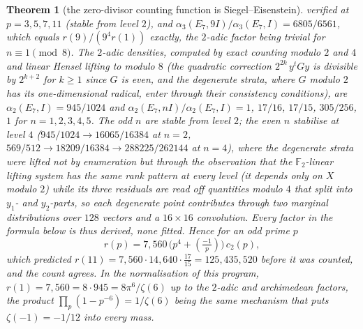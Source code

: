 \documentclass[11pt]{amsart}
\newtheorem{theorem}{Theorem}[section]
\theoremstyle{definition}
\begin{document}
\begin{theorem}[the zero-divisor counting function is Siegel--Eisenstein]
verified at $p=3,5,7,11$ (stable from level $2$), and $\alpha_3(E_7,9I)/\alpha_3(E_7,I)=6805/6561$, which equals $r(9)/(9^4r(1))$ exactly, the $2$-adic factor being trivial for $n\equiv1\pmod 8$. The $2$-adic densities, computed by exact counting modulo $2$ and $4$ and linear Hensel lifting to modulo $8$ (the quadratic correction $2^{2k}\,y^tGy$ is divisible by $2^{k+2}$ for $k\ge1$ since $G$ is even, and the degenerate strata, where $G$ modulo $2$ has its one-dimensional radical, enter through their consistency conditions), are $\alpha_2(E_7,I)=945/1024$ and $\alpha_2(E_7,nI)/\alpha_2(E_7,I)=1$, $17/16$, $17/15$, $305/256$, $1$ for $n=1,2,3,4,5$. The odd $n$ are stable from level $2$; the even $n$ stabilise at level $4$ ($945/1024\to16065/16384$ at $n=2$, $569/512\to18209/16384\to288225/262144$ at $n=4$), where the degenerate strata were lifted not by enumeration but through the observation that the $\mathbb F_2$-linear lifting system has the same rank pattern at every level (it depends only on $X$ modulo $2$) while its three residuals are read off quantities modulo $4$ that split into $y_1$- and $y_2$-parts, so each degenerate point contributes through two marginal distributions over $128$ vectors and a $16\times16$ convolution. Every factor in the formula below is thus derived, none fitted. Hence for an odd prime $p$
\[r(p)=7{,}560\,\big(p^4+(\tfrac{-1}{p})\big)\,c_2(p),\]
which predicted $r(11)=7{,}560\cdot14{,}640\cdot\tfrac{17}{15}=125{,}435{,}520$ before it was counted, and the count agrees. In the normalisation of this program, $r(1)=7{,}560=8\cdot945=8\pi^6/\zeta(6)$ up to the $2$-adic and archimedean factors, the product $\prod_p(1-p^{-6})=1/\zeta(6)$ being the same mechanism that puts $\zeta(-1)=-1/12$ into every mass.
\end{theorem}
\end{document}
